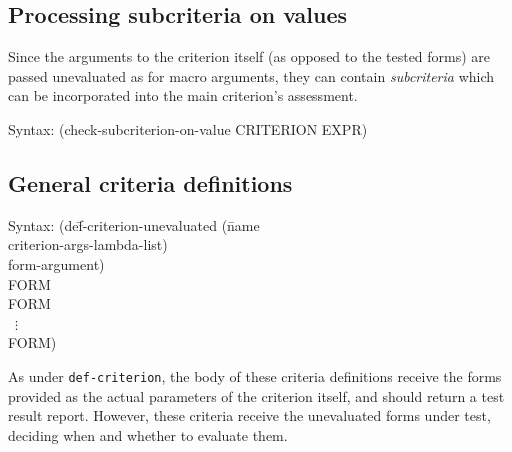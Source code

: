\subsection{Processing subcriteria on values}
\label{sec:subcriteria-values}
Since the arguments to the criterion itself (as opposed to the tested
forms) are passed unevaluated as for macro arguments, they can contain
\emph{subcriteria} which can be incorporated into the main criterion's
assessment.%

{\ttfamily\begin{tabbing}
\textrm{Syntax: }(check-subcriterion-on-value CRITERION EXPR)
\end{tabbing}}
% 

\subsection{General criteria definitions}
\label{sec:def-criterion-unevaluated}
{\ttfamily\begin{tabbing}
\textrm{Syntax: }(de\=f-criterion-unevaluated (\=name
\\ \>            \>criterion-args-lambda-list)
\\ \>            \>form-argument)
\\ \> FORM
\\ \> FORM
\\ \> ~$\vdots$
\\ \> FORM)
\end{tabbing}}%
As under \texttt{def-criterion}, the body of these criteria
definitions receive the forms provided as the actual parameters of the
criterion itself, and should return a test result report.  However,
these criteria receive the unevaluated forms under test, deciding when
and whether to evaluate them.
% 
% 

